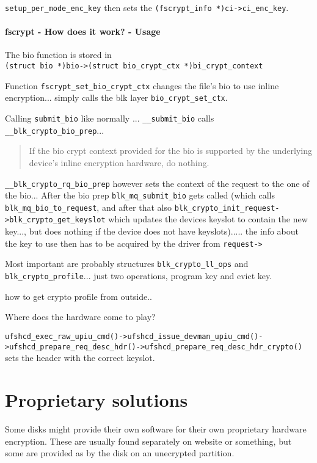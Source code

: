 \verb|setup_per_mode_enc_key| then sets the \verb|(fscrypt_info *)ci->ci_enc_key|.

\paragraph{fscrypt - How does it work? - Usage}

The bio function is stored in \\ \verb|(struct bio *)bio->(struct bio_crypt_ctx *)bi_crypt_context|

Function \verb|fscrypt_set_bio_crypt_ctx| changes the file's bio to use inline encryption... simply calls the blk layer \verb|bio_crypt_set_ctx|.

Calling \verb|submit_bio| like normally ... \verb|__submit_bio| calls \verb|__blk_crypto_bio_prep|...

\blockquote{If the bio crypt context provided for the bio is supported by the underlying device's inline encryption hardware, do nothing.}

\verb|__blk_crypto_rq_bio_prep| however sets the context of the request to the one of the bio... 
After the bio prep  \verb|blk_mq_submit_bio| gets called (which calls \verb|blk_mq_bio_to_request|, and after that also \verb|blk_crypto_init_request->blk_crypto_get_keyslot| which updates the devices keyslot to contain the new key..., but does nothing if the device does not have keyslots)..... the info about the key to use then has to be acquired by the driver from \verb|request->|


Most important are probably structures \verb|blk_crypto_ll_ops| and \verb|blk_crypto_profile|... just two operations, program key and evict key. 



how to get crypto profile from outside..




Where does the hardware come to play?

\verb|ufshcd_exec_raw_upiu_cmd()->ufshcd_issue_devman_upiu_cmd()->ufshcd_prepare_req_desc_hdr()->ufshcd_prepare_req_desc_hdr_crypto()| sets the header with the correct keyslot.






\section{Proprietary solutions}

Some disks might provide their own software for their own proprietary hardware encryption. These are usually found separately on website or something, but some are provided as by the disk on an unecrypted partition.

